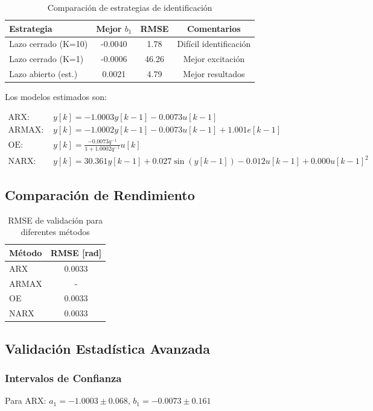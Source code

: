 \documentclass[a4paper,openright,9pt]{report}
\begin{document}
\begin{table}[H]
\centering
\caption{Comparación de estrategias de identificación}
\label{tab:estrategias}
\begin{tabular}{@{}lccc@{}}
\toprule
Estrategia & Mejor $b_1$ & RMSE & Comentarios \\
\midrule
Lazo cerrado (K=10) & -0.0040 & 1.78 & Difícil identificación \\
Lazo cerrado (K=1) & -0.0006 & 46.26 & Mejor excitación \\
Lazo abierto (est.) & 0.0021 & 4.79 & Mejor resultados \\
\bottomrule
\end{tabular}
\end{table}

Los modelos estimados son:

\begin{align*}
\text{ARX: } & y[k] = -1.0003 y[k-1] - 0.0073 u[k-1] \\
\text{ARMAX: } & y[k] = -1.0002 y[k-1] - 0.0073 u[k-1] + 1.001 e[k-1] \\
\text{OE: } & y[k] = \frac{-0.0073 q^{-1}}{1 + 1.0002 q^{-1}} u[k] \\
\text{NARX: } & y[k] = 30.361 y[k-1] + 0.027 \sin(y[k-1]) - 0.012 u[k-1] + 0.000 u[k-1]^2
\end{align*}

\subsection{Comparación de Rendimiento}

\begin{table}[H]
\centering
\caption{RMSE de validación para diferentes métodos}
\label{tab:rmse}
\begin{tabular}{@{}lc@{}}
\toprule
Método & RMSE [rad] \\
\midrule
ARX    & 0.0033 \\
ARMAX  & - \\
OE     & 0.0033 \\
NARX   & 0.0033 \\
\bottomrule
\end{tabular}
\end{table}

\subsection{Validación Estadística Avanzada}

\subsubsection{Intervalos de Confianza}
Para ARX: $a_1 = -1.0003 \pm 0.068$, $b_1 = -0.0073 \pm 0.161$
\end{document}
